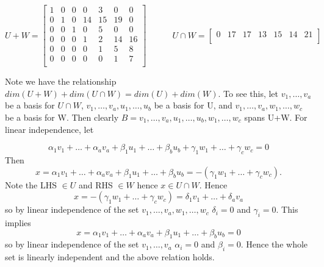 \documentclass[10pt,a4paper]{report}
\begin{document}
\begin{equation*}
U+W=\begin{bmatrix}
1 & 0 & 0 & 0 & 3 & 0 & 0 \\
0 & 1 & 0 & 14 & 15 & 19 & 0 \\
0 & 0 & 1 & 0 & 5 & 0 & 0 \\
0 & 0 & 0 & 1 & 2 & 14 & 16 \\
0 & 0 & 0 & 0 & 1 & 5 & 8 \\
0 & 0 & 0 & 0 & 0 & 1 & 7 \\
\end{bmatrix}
\quad \quad \quad
U \cap W=\begin{bmatrix}
0 & 17 & 17 & 13 & 15 & 14 & 21 \\
\end{bmatrix}
\end{equation*}

\vspace{1cm}	

Note we have the relationship $dim(U+W)+dim(U \cap W)=dim(U)+dim(W)$. To see this, let ${v_1, \ldots , v_a}$ be a basis for $U \cap W$, ${v_1, \ldots ,v_a,u_1, \ldots ,u_b}$ be a basis for U, and ${v_1, \ldots ,v_a,w_1, \ldots, w_c}$ be a basis for W. Then clearly $B= {v_1, \ldots,v_a, u_1, \ldots, u_b, w_1, \ldots, w_c}$ spans U+W. For linear independence, let 

\begin{equation*}
\alpha_1v_1 + \ldots + \alpha_av_a + \beta_1u_1 + \ldots + \beta_bu_b + \gamma_1w_1 + \ldots + \gamma_cw_c = 0
\end{equation*}
Then
\begin{equation*}
x=\alpha_1v_1 + \ldots + \alpha_av_a + \beta_1u_1 + \ldots + \beta_bu_b = -(\gamma_1w_1 + \ldots + \gamma_cw_c). 
\end{equation*}
Note the LHS $\in U$ and RHS $\in W$ hence $x \in U \cap W$. Hence 
\begin{equation*}
x=-(\gamma_1w_1 + \ldots + \gamma_cw_c)=\delta_1v_1 + \ldots + \delta_av_a
\end{equation*}
so by linear independence of the set ${v_1, \ldots ,v_a,w_1, \ldots, w_c}$ $\delta_i=0$ and $\gamma_i=0$. This implies 
\begin{equation*}
x=\alpha_1v_1 + \ldots + \alpha_av_a + \beta_1u_1 + \ldots + \beta_bu_b=0
\end{equation*}
so by linear independence of the set ${v_1, \ldots , v_a}$ $\alpha_i=0$ and $\beta_i=0$. Hence the whole set is linearly independent and the above relation holds.
\end{document}
